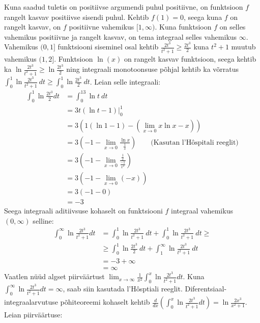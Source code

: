 \documentclass{article}
\begin{document}
Kuna saadud tuletis on positiivse argumendi puhul positiivne, on funktsioon $f$ rangelt kasvav positiivse sisendi puhul. Kehtib $f(1)=0$, seega kuna $f$ on rangelt kasvav, on $f$ positiivne vahemikus $[1,\infty)$. Kuna funktsioon $f$ on selles vahemikus positiivne ja rangelt kasvav, on tema integraal selles vahemikus $\infty$.
Vahemikus $(0,1]$ funktsiooni siseminel osal kehtib $\frac{2t^3}{t^2+1} \geq \frac{2t^3}{2}$ kuna $t^2+1$ muutub vahemikus $(1,2]$. Funktsioon $\ln(x)$ on rangelt kasvav funktsioon, seega kehtib ka $\ln\frac{2t^3}{t^2+1} \geq \ln\frac{2t^3}{2}$ ning integraali monotoonsuse p\~ohjal kehtib ka v\~orratus $\int_0^1\ln\frac{2t^3}{t^2+1}\ dt \geq \int_0^1\ln\frac{2t^3}{2}\ dt$. Leian selle integraali:
\begin{equation*}
\begin{aligned}
\int_0^1\ln\frac{2t^3}{2}dt&=\int_0^13\ln t\ dt\\
&=3t(\ln t-1)|_0^1\\
&=3(1(\ln 1-1)-(\lim_{x\to0}x\ln x-x))\\
&=3(-1-\lim_{x\to0}\frac{\ln x}{\frac{1}{x}})\qquad \text{(Kasutan\ l'H\^ospitali\ reeglit)}\\
&=3(-1-\lim_{x\to0}\frac{\frac{1}{x}}{\frac{-1}{x^2}})\\
&=3(-1-\lim_{x\to0}(-x))\\
&=3(-1-0)\\
&=-3
\end{aligned}
\end{equation*}
Seega integraali aditiivsuse kohaselt on funktsiooni $f$ integraal vahemikus $(0,\infty)$ selline:
\begin{equation*}
\begin{aligned}
\int_0^\infty\ln\frac{2t^3}{t^2+1}dt&=\int_0^1\ln\frac{2t^3}{t^2+1}\ dt+\int_0^1\ln\frac{2t^3}{t^2+1}\ dt\geq\\
&\geq \int_0^1\ln\frac{2t^3}{2}\ dt+\int_1^\infty\ln\frac{2t^3}{t^2+1}\ dt\\
&=-3+\infty\\
&=\infty
\end{aligned}
\end{equation*}
Vaatlen n\"u\"ud algset piirv\"a\"artust $\displaystyle\lim_{x\to\infty}\frac{1}{x^2}\int_0^x\ln\frac{2t^3}{t^2+1}dt$. Kuna $\displaystyle\int_0^\infty\ln\frac{2t^3}{t^2+1}dt=\infty$, saab siin kasutada l'H\^osptiali reeglit. Diferentsiaal-integraalarvutuse p\~ohiteoreemi kohaselt kehtib $\displaystyle\frac{d}{dx}\left(\int_0^x\ln\frac{2t^3}{t^2+1}dt\right)=\ln\frac{2x^3}{x^2+1}$. Leian piirv\"a\"artuse:
\end{document}
